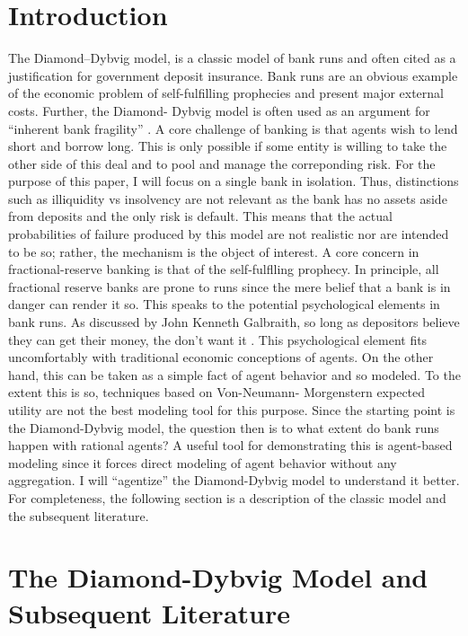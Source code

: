 \documentclass[12pt]{article}
\begin{document}
\begin{doublespace}
\section*{Introduction}
The Diamond--Dybvig model, \citet{diamond1983bank} is a classic model of bank runs and often cited as a justification for government deposit insurance. Bank runs are an obvious example of the economic
problem of self-fulfilling prophecies and present major external costs. Further, the Diamond-
Dybvig model is often used as an argument for “inherent bank fragility” \citet{white1999theory}.
A core challenge of banking is that agents wish to lend short and borrow long. This is only possible if some entity is
willing to take the other side of this deal and to pool and manage the correponding risk. For the purpose of this paper, I will
focus on a single bank in isolation. Thus, distinctions such as illiquidity vs insolvency are not relevant  as the bank has no assets aside from deposits and the only risk is default. This means that the actual probabilities of failure produced by this model are not realistic nor are intended to be so; rather, the mechanism is the object of interest.
 A core concern in fractional-reserve banking is that of the self-fulflling prophecy. In principle, all fractional reserve banks are prone to runs since the mere belief that a bank
is in danger can render it so. This speaks to the potential psychological elements in bank runs. As discussed by John Kenneth Galbraith,
so long as depositors believe they can get their money, the don’t want it \citet{galbraith2017money}.
 This psychological element fits uncomfortably with traditional economic conceptions of agents. On the other hand, this
can be taken as a simple fact of agent behavior and so modeled. To the extent this is so,
techniques based on Von-Neumann- Morgenstern expected utility are not the best modeling
tool for this purpose. Since the starting point is the Diamond-Dybvig model, the question then is to what extent do bank runs happen with rational agents? A useful tool for demonstrating this is agent-based modeling since it forces direct modeling of agent behavior without any aggregation. I will ``agentize'' the Diamond-Dybvig model to understand it better.
For completeness, the following section is a description of the classic model and the subsequent literature.
\section{The Diamond-Dybvig Model and Subsequent Literature}


\end{doublespace}
\end{document}
